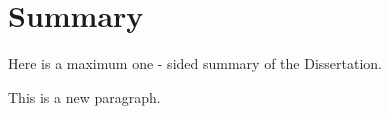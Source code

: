 

\chapter*{Summary}

Here is a maximum one - sided summary of the
Dissertation.

This is a new paragraph.